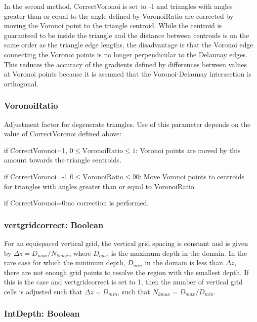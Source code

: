 In the second method, CorrectVoronoi is set to -1 and triangles
with angles greater than or equal to the angle defined by VoronoiRatio are corrected by moving the Voronoi point
to the triangle centroid.  While the centroid is guaranteed to be inside the triangle and the distance between
centroids is on the same order as the triangle edge lengths, the disadvantage is that the Voronoi edge connecting
the Voronoi points is no longer perpendicular to the Delaunay edges.  This reduces the accuracy of the gradients
defined by differences between values at Voronoi points because it is assumed that the Voronoi-Delaunay intersection
is orthogonal.

\subsubsection{VoronoiRatio}

Adjustment factor for degenerate triangles.  Use of this parameter depends on the value of 
CorrectVoronoi defined above:

\medskip
\noindent
if CorrectVoronoi=1, $0\le \mbox{VoronoiRatio} \le 1$: Voronoi points are moved by this amount towards the
triangle centroids.

\medskip
\noindent
if CorrectVoronoi=-1 $0\le \mbox{VoronoiRatio} \le 90$: Move Voronoi points to centroids for triangles with
angles greater than or equal to VoronoiRatio.

\medskip
\noindent
if CorrectVoronoi=0:no correction is performed.

\subsubsection{vertgridcorrect: Boolean}

For an equispaced vertical grid, the vertical grid spacing is constant and
is given by $\Delta z=D_{max}/N_{kmax}$, where $D_{max}$ is the maximum depth in the domain.
In the rare case for which the minimum depth, $D_{min}$ in the domain is less than $\Delta z$, there
are not enough grid points to resolve the region with the smallest depth.  If this is the
case and vertgridcorrect
is set to 1, then the number of vertical grid cells is adjusted such that $\Delta z=D_{min}$,
such that $N_{kmax}=D_{max}/D_{min}$.

\subsubsection{IntDepth: Boolean}


